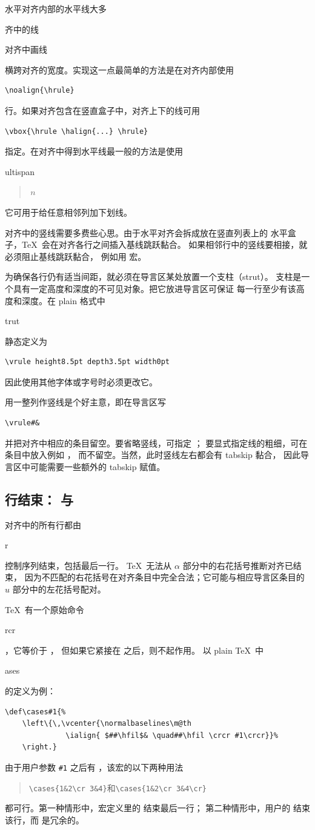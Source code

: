 \documentclass[a4paper]{rapport3}
\makeatletter
\newenvironment{disp}{\begin{quotation}}{\end{quotation}}
\def\term#1\par{\index{#1}}
\def\howto#1\par{}
\def\cstoidx#1\par{\index{#1@\cs{#1}}}
\def\csidx#1{\cstoidx #1\par\cs{#1}}
\makeatother
\begin{document}
水平对齐内部的水平线大多
\term 对齐中的线\par
\howto 在对齐中画线\par
横跨对齐的宽度。实现这一点最简单的方法是在对齐内部使用
\begin{verbatim}
\noalign{\hrule}
\end{verbatim}
行。如果对齐包含在竖直盒子中，对齐上下的线可用
\begin{verbatim}
\vbox{\hrule \halign{...} \hrule}
\end{verbatim}
指定。在对齐中得到水平线最一般的方法是使用
\cstoidx multispan\par
\begin{disp}$\,n$\end{disp}
它可用于给任意相邻列加下划线。

对齐中的竖线需要多费些心思。由于水平对齐会拆成放在竖直列表上的
水平盒子，\TeX\ 会在对齐各行之间插入基线跳跃黏合。
如果相邻行中的竖线要相接，就必须阻止基线跳跃黏合，
例如用  宏。

为确保各行仍有适当间距，就必须在导言区某处放置一个{\italic 支柱（strut）\/}。
支柱是一个具有一定高度和深度的不可见对象。把它放进导言区可保证
每一行至少有该高度和深度。在 plain 格式中 \csidx{strut} 静态定义为
\begin{verbatim}
\vrule height8.5pt depth3.5pt width0pt
\end{verbatim}
因此使用其他字体或字号时必须更改它。

用一整列作竖线是个好主意，即在导言区写
\begin{verbatim}
\vrule#&
\end{verbatim}
并把对齐中相应的条目留空。要省略竖线，可指定 ；
要显式指定线的粗细，可在条目中放入例如 \hbox{}，
而不留空。当然，此时竖线左右都会有 tabskip 黏合，
因此导言区中可能需要一些额外的 tabskip 赋值。

\subsection{行结束： 与 }

对齐中的所有行都由 \csidx{cr} 控制序列结束，包括最后一行。
\TeX\ 无法从 $\alpha$ 部分中的右花括号推断对齐已结束，
因为不匹配的右花括号在对齐条目中完全合法；它可能与相应导言区条目的
$u$ 部分中的左花括号配对。

\TeX\ 有一个原始命令 \csidx{crcr}，它等价于 ，
但如果它紧接在  之后，则不起作用。
以 plain \TeX\ 中 \csidx{cases} 的定义为例：
\begin{verbatim}
\def\cases#1{%
    \left\{\,\vcenter{\normalbaselines\m@th
              \ialign{ $##\hfil$& \quad##\hfil \crcr #1\crcr}}%
    \right.}
\end{verbatim}
由于用户参数 \verb.#1. 之后有 ，该宏的以下两种用法
\begin{disp}\verb>\cases{1&2\cr 3&4}>\quad 和\quad \verb>\cases{1&2\cr 3&4\cr}>\end{disp}
都可行。第一种情形中，宏定义里的  结束最后一行；
第二种情形中，用户的  结束该行，而  是冗余的。
\end{document}
